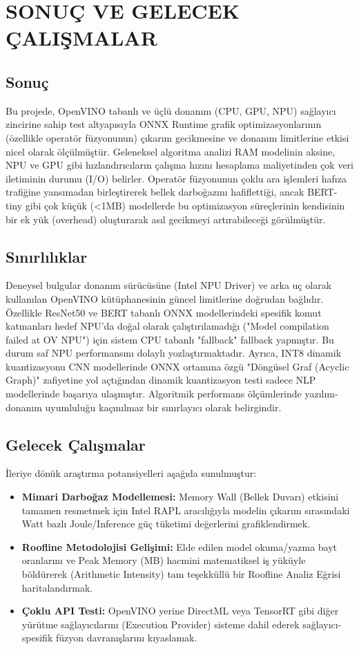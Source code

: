 \chapter{SONUÇ VE GELECEK ÇALIŞMALAR}

\section{Sonuç}
Bu projede, OpenVINO tabanlı ve üçlü donanım (CPU, GPU, NPU) sağlayıcı zincirine sahip test altyapısıyla ONNX Runtime grafik optimizasyonlarının (özellikle operatör füzyonunun) çıkarım gecikmesine ve donanım limitlerine etkisi nicel olarak ölçülmüştür.
Geleneksel algoritma analizi RAM modelinin aksine, NPU ve GPU gibi hızlandırıcıların çalışma hızını hesaplama maliyetinden çok veri iletiminin durumu (I/O) belirler. 
Operatör füzyonunun çoklu ara işlemleri hafıza trafiğine yansımadan birleştirerek bellek darboğazını hafiflettiği, ancak BERT-tiny gibi çok küçük (<1MB) modellerde bu optimizasyon süreçlerinin kendisinin bir ek yük (overhead) oluşturarak asıl gecikmeyi artırabileceği görülmüştür.

\section{Sınırlılıklar}
Deneysel bulgular donanım sürücüsüne (Intel NPU Driver) ve arka uç olarak kullanılan OpenVINO kütüphanesinin güncel limitlerine doğrudan bağlıdır.
Özellikle ResNet50 ve BERT tabanlı ONNX modellerindeki spesifik komut katmanları hedef NPU'da doğal olarak çalıştırılamadığı ("Model compilation failed at OV NPU") için sistem CPU tabanlı "fallback" fallback yapmıştır. Bu durum saf NPU performansını dolaylı yozlaştırmaktadır. Ayrıca, INT8 dinamik kuantizasyonu CNN modellerinde ONNX ortamına özgü "Döngüsel Graf (Acyclic Graph)" zafiyetine yol açtığından dinamik kuantizasyon testi sadece NLP modellerinde başarıya ulaşmıştır. Algoritmik performans ölçümlerinde yazılım-donanım uyumluluğu kaçınılmaz bir sınırlayıcı olarak belirgindir.

\section{Gelecek Çalışmalar}
İleriye dönük araştırma potansiyelleri aşağıda sunulmuştur:
\begin{itemize}
	\item \textbf{Mimari Darboğaz Modellemesi:} Memory Wall (Bellek Duvarı) etkisini tamamen resmetmek için Intel RAPL aracılığıyla modelin çıkarım sırasındaki Watt bazlı Joule/Inference güç tüketimi değerlerini grafiklendirmek.
	\item \textbf{Roofline Metodolojisi Gelişimi:} Elde edilen model okuma/yazma bayt oranlarını ve Peak Memory (MB) hacmini matematiksel iş yüküyle böldürerek (Arithmetic Intensity) tam teşekküllü bir Roofline Analiz Eğrisi haritalandırmak.
	\item \textbf{Çoklu API Testi:} OpenVINO yerine DirectML veya TensorRT gibi diğer yürütme sağlayıcılarını (Execution Provider) sisteme dahil ederek sağlayıcı-spesifik füzyon davranışlarını kıyaslamak.
\end{itemize}